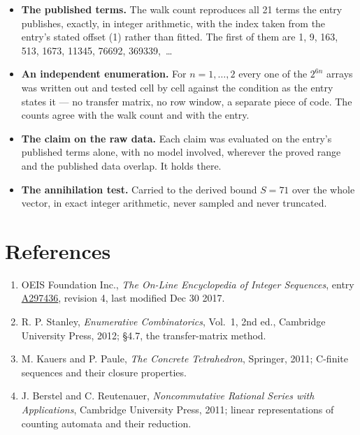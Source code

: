 \documentclass[11pt]{article}
\theoremstyle{definition}
\begin{document}
\begin{itemize}

\item {\bfseries The published terms.} The walk count reproduces all 21 terms the entry publishes, exactly, in integer arithmetic, with the index taken from the entry's stated offset (1) rather than fitted. The first of them are 1, 9, 163, 513, 1673, 11345, 76692, 369339,~\dots

\item {\bfseries An independent enumeration.} For $n = 1,\dots,2$ every one of the $2^{6n}$ arrays was written out and tested cell by cell against the condition as the entry states it --- no transfer matrix, no row window, a separate piece of code. The counts agree with the walk count and with the entry.

\item {\bfseries The claim on the raw data.} Each claim was evaluated on the entry's published terms alone, with no model involved, wherever the proved range and the published data overlap. It holds there.

\item {\bfseries The annihilation test.} Carried to the derived bound $S = 71$ over the whole vector, in exact integer arithmetic, never sampled and never truncated.

\end{itemize}

\section{References}

\begin{enumerate}

\item OEIS Foundation Inc., \emph{The On-Line Encyclopedia of Integer Sequences}, entry \href{https://oeis.org/A297436}{A297436}, revision 4, last modified Dec 30 2017.

\item R. P. Stanley, \emph{Enumerative Combinatorics}, Vol.~1, 2nd ed., Cambridge University Press, 2012; \S4.7, the transfer-matrix method.

\item M. Kauers and P. Paule, \emph{The Concrete Tetrahedron}, Springer, 2011; C-finite sequences and their closure properties.

\item J. Berstel and C. Reutenauer, \emph{Noncommutative Rational Series with Applications}, Cambridge University Press, 2011; linear representations of counting automata and their reduction.

\end{enumerate}
\end{document}
